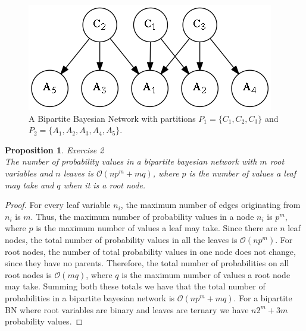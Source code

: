 \documentclass{amsart}
\theoremstyle{plain}
\newtheorem{proposition}{Proposition}
\begin{document}
\begin{figure}[h]
  \captionsetup{justification=centering}
  \centering\includegraphics[scale=0.5]{graphs/bipartite.png}
  \caption{A Bipartite Bayesian Network with partitions $P_1=\{C_1,C_2,C_3\}$ and $P_2=\{A_1,A_2,
  A_3,A_4,A_5\}$.}
\end{figure}

\begin{proposition} Exercise 2\\
  The number of probability values in a bipartite bayesian network with $m$ root variables and $n$
  leaves is $\mathcal{O}(np^m+mq)$, where $p$ is the number of values a leaf may take and $q$ when
  it is a root node.
\end{proposition}

\begin{proof}
  For every leaf variable $n_i$, the maximum number of edges originating from $n_i$ is $m$. Thus,
  the maximum number of probability values in a node $n_i$ is $p^m$, where $p$ is the maximum
  number of values a leaf may take. Since there are $n$ leaf nodes, the total number of probability
  values in all the leaves is $\mathcal{O}(np^m)$. For root nodes, the number of total probability
  values in one node does not change, since they have no parents. Therefore, the total number of
  probabilities on all root nodes is $\mathcal{O}(mq)$, where $q$ is the maximum number of values a
  root node may take. Summing both these totals we have that the total number of probabilities in
  a bipartite bayesian network is $\mathcal{O}(np^m + mq)$. For a bipartite BN where root variables
  are binary and leaves are ternary we have $n2^m+3m$ probability values.
\end{proof}

\newpage

\printbibliography[]
\end{document}
